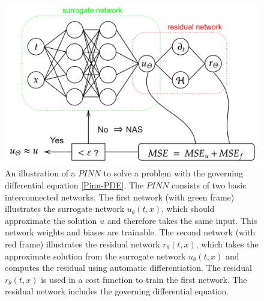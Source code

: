 \begin{figure}[H]
    \begin{center}
        \includegraphics[scale=0.3]{img/diagram-20220212.png}
    \end{center}
    \caption{An illustration of a $PINN$ to solve a problem with the governing differential equation \cref{Pinn-PDE}. The $PINN$ consists of two basic interconnected networks. The first network (with green frame) illustrates the surrogate network $u_\theta(t,x)$, which should approximate the solution $u$ and therefore takes the same input. This network weights and biases are trainable. The second network (with red frame) illustrates the residual network $r_\theta(t,x)$, which takes the approximate solution from the surrogate network $u_\theta(t,x)$ and computes the residual using automatic differentiation. The residual $r_\theta(t,x)$ is used in a cost function to train the first network. The residual network includes the governing differential equation.}
    \label{fig6}
\end{figure}


